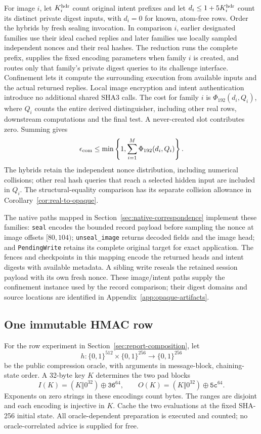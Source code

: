 \documentclass[pdflatex]{sn-jnl}
\theoremstyle{thmstyleone}
\theoremstyle{thmstylethree}
\theoremstyle{thmstyletwo}
\begin{document}
For image $i$, let $K_i^{\rm hdr}$ count original intent prefixes and let
$d_i\le1+5K_i^{\rm hdr}$ count its distinct private digest inputs, with
$d_i=0$ for known, atom-free rows. Order the hybrids by fresh sealing
invocation. In comparison $i$, earlier designated families use their ideal cached
replies and later families use locally sampled independent nonces and
their real hashes. The reduction runs the complete prefix, supplies the
fixed encoding parameters when family $i$ is created, and routes only that
family's private digest queries to its challenge interface. Confinement
lets it compute the surrounding execution from available inputs and the
actual returned replies. Local image encryption and intent authentication
introduce no additional shared SHA3 calls. The cost for family $i$ is
$\Phi_{192}(d_i,Q_i)$, where $Q_i$ counts the entire derived distinguisher,
including other real rows, downstream computations and the final test.
A never-created slot contributes zero. Summing gives
\[
 \epsilon_{\rm com}
 \le\min\left\{1,\sum_{i=1}^{M}\Phi_{192}(d_i,Q_i)\right\}.
\]
The hybrids retain the independent nonce distribution, including numerical
collisions; other real hash queries that reach a selected hidden input are
included in $Q_i$. The structural-equality comparison has its separate
collision allowance in Corollary~\ref{cor:real-to-opaque}.

The native paths mapped in Section~\ref{sec:native-correspondence} implement
these families: \texttt{seal} encodes the bounded record payload before
sampling the nonce at image offsets $[80,104)$; \texttt{unseal\_image}
returns decoded fields and the image head; and \texttt{PendingWrite}
retains its complete original target for exact application. The fences
and checkpoints in this mapping encode the returned heads and intent digests with
available metadata. A sibling write reseals the retained session payload
with its own fresh nonce. These image/intent paths supply the confinement
instance used by the record comparison; their digest domains and source
locations are identified in Appendix~\ref{app:opaque-artifacts}.

\subsection{One immutable HMAC row}

For the row experiment in Section~\ref{sec:report-composition}, let
\[
 h:\{0,1\}^{512}\times\{0,1\}^{256}\longrightarrow\{0,1\}^{256}
\]
be the public compression oracle, with arguments in message-block,
chaining-state order. A 32-byte key $K$ determines the two pad blocks
\[
 I(K)=(K\Vert0^{32})\oplus\mathtt{36}^{64},\qquad
 O(K)=(K\Vert0^{32})\oplus\mathtt{5c}^{64}.
\]
Exponents on zero strings in these encodings count bytes. The ranges are disjoint and
each encoding is injective in $K$. Cache the two evaluations at the fixed
SHA-256 initial state. All oracle-dependent preparation is executed and
counted; no oracle-correlated advice is supplied for free.
\end{document}
